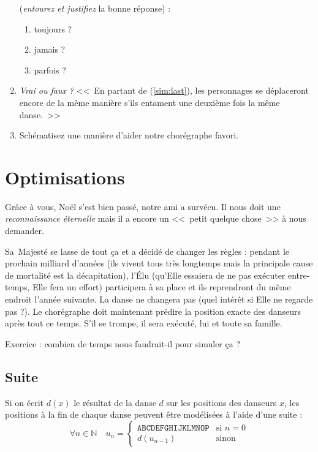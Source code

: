 \documentclass[11pt,a4paper,oneside]{book}
\begin{document}
\begin{enumerate}
	(\emph{entourez et justifiez} la bonne réponse) :
	\begin{enumerate}
		\item toujours ? 
		\item jamais ? 
		\item parfois ?
	\end{enumerate}
\item \emph{Vrai ou faux ?}
	<<~En partant de (\ref{sim:last}), les personnages se déplaceront encore de
	la même manière s'ils entament une deuxième fois la même danse.~>>
\item Schématisez une manière d'aider notre chorégraphe favori.
\end{enumerate}

\chapter{Optimisations}
Grâce à vous, Noël s'est bien passé, notre ami a survécu.
Il nous doit une \emph{reconnaissance éternelle}
mais il a encore un <<~petit quelque chose~>> à nous demander.

Sa~Majesté se lasse de tout ça et a décidé de changer les règles :
pendant le prochain milliard d'années (ils vivent tous très longtemps mais la
principale cause de mortalité est la décapitation), l'Élu
(qu'Elle essaiera de ne pas exécuter entre-temps, Elle fera un effort)
participera à sa place et ils reprendront du même endroit l'année suivante.
La danse ne changera pas (quel intérêt si Elle ne regarde pas ?).
Le chorégraphe doit maintenant prédire la position exacte des danseurs après
tout ce temps. S'il se trompe, il sera exécuté, lui et toute sa famille.

Exercice : combien de temps nous faudrait-il pour simuler ça ?

\section{Suite}
Si on écrit $d(x)$ le résultat de la danse $d$ sur les positions des danseurs
$x$, les positions à la fin de chaque danse peuvent être modélisées à l'aide
d'une suite :\[
	\forall n \in \mathbb{N} \quad u_n =
	\left\{\begin{array}{ll}
		\texttt{ABCDEFGHIJKLMNOP} & \text{si $n=0$} \\
		d\left(u_{n-1}\right) & \text{sinon}
	\end{array}\right.
\]
\end{document}
